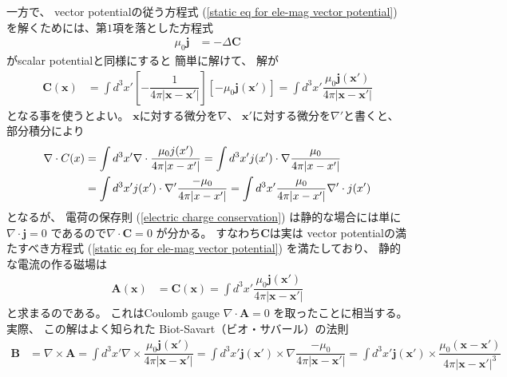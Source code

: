 一方で、
vector potentialの従う方程式
(\ref{static eq for ele-mag vector potential})
を解くためには、第$1$項を落とした方程式
\begin{align}
  \mu_0 \bm{j}
&=
  -
    \Delta
    \bm{C}
\end{align}
がscalar potentialと同様にすると
簡単に解けて、
解が
\begin{align}
  \bm{C} (\bm{x})
&=
  \int d^3 x'
  \left[
    - \dfrac{1}{
      4 \pi |\bm{x} - \bm{x}'|
    }
  \right]
  \left[
    - \mu_0
    \bm{j} (\bm{x}')
  \right]
=
  \int d^3 x'
    \dfrac{
      \mu_0 \bm{j} (\bm{x}')
    }{
      4 \pi
      |\bm{x} - \bm{x}'|
    }
\end{align}
となる事を使うとよい。
$\bm{x}$に対する微分を$\nabla$、
$\bm{x}'$に対する微分を$\nabla'$と書くと、
部分積分により
\begin{align}
  \nabla \cdot C(x)
&=
  \int d^3 x'
    \nabla \cdot
    \dfrac{
      \mu_0 j (x')
    }{
      4 \pi
      |x - x'|
    }
=
  \int d^3 x'
    j (x')
  \cdot
    \nabla
    \dfrac{ \mu_0 }{
      4 \pi
      |x - x'|
    }
\notag\\&
=
  \int d^3 x'
    j (x')
  \cdot
    \nabla'
    \dfrac{ -\mu_0 }{
      4 \pi
      |x - x'|
    }
=
  \int d^3 x'
    \dfrac{ \mu_0 }{
      4 \pi
      |x - x'|
    }
    \nabla' \cdot j (x')
\end{align}
となるが、
電荷の保存則
(\ref{electric charge conservation})
は静的な場合には単に
$\nabla \cdot \bm{j} = 0$
であるので$\nabla \cdot \bm{C} = 0$
が分かる。
すなわち$\bm{C}$は実は
vector potentialの満たすべき方程式
(\ref{static eq for ele-mag vector potential})
を満たしており、
静的な電流の作る磁場は
\begin{align}
  \bm{A} (\bm{x})
&=
  \bm{C} (\bm{x})
=
  \int d^3 x'
    \dfrac{
      \mu_0 \bm{j} (\bm{x}')
    }{
      4 \pi
      |\bm{x} - \bm{x}'|
    }
\end{align}
と求まるのである。
これはCoulomb gauge
$\nabla \cdot\bm{A} = 0$
を取ったことに相当する。
実際、
この解はよく知られた
Biot-Savart（ビオ・サバール）の法則
\begin{align}
  \bm{B}
&=
  \nabla \times \bm{A}
=
  \int d^3 x'
  \nabla \times
    \dfrac{
      \mu_0 \bm{j} (\bm{x}')
    }{
      4 \pi
      |\bm{x} - \bm{x}'|
    }
=
  \int d^3 x'
  \bm{j} (\bm{x}') \times
  \nabla
    \dfrac{
      - \mu_0
    }{
      4 \pi
      |\bm{x} - \bm{x}'|
    }
=
  \int d^3 x'
  \bm{j} (\bm{x}') \times
    \dfrac{
      \mu_0
      (\bm{x} - \bm{x}')
    }{
      4 \pi
      |\bm{x} - \bm{x}'|^3
    }
\end{align}
